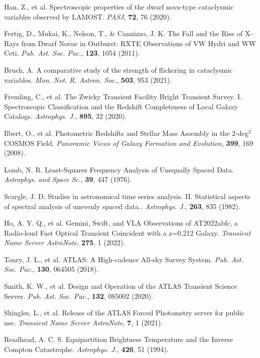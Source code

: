 \documentclass{nature_plusfigure}
\newcommand{\mn}{{Mon. Not. R. Astron. Soc.}}
\newcommand{\mnras}{\mn}
\newcommand{\apj}{{Astrophys. J.}}
\newcommand{\apss}{{Astrophys. and Space Sc.}}
\newcommand{\pasj}{{PASJ}}
\newcommand{\pasp}{{Pub. Ast. Soc. Pac.}}
\begin{document}
\begin{methods}
\begin{thebibliography}{10}
 Han, Z., et al. Spectroscopic properties of the dwarf nova-type cataclysmic variables observed by LAMOST. \emph{\pasj}, \textbf{72}, 76 (2020). 

 Fertig, D., Mukai, K., Nelson, T., \& Cannizzo, J. K. The Fall and the Rise of X-Rays from Dwarf Novae in Outburst: RXTE Observations of VW Hydri and WW Ceti. \emph{\pasp}, \textbf{123}, 1054 (2011). 

 Bruch, A. A comparative study of the strength of flickering in cataclysmic variables. \emph{\mnras}, \textbf{503}, 953 (2021). 

 Fremling, C., et al. The Zwicky Transient Facility Bright Transient Survey. I. Spectroscopic Classification and the Redshift Completeness of Local Galaxy Catalogs. \emph{\apj}, \textbf{895}, 32 (2020).

 Ilbert, O., et al. Photometric Redshifts and Stellar Mass Assembly in the 2-deg$^2$ COSMOS Field. \emph{Panoramic Views of Galaxy Formation and Evolution}, \textbf{399}, 169 (2008). 


 Lomb, N. R. Least-Squares Frequency Analysis of Unequally Spaced Data. \emph{\apss}, \textbf{39}, 447 (1976). 

 Scargle, J. D. Studies in astronomical time series analysis. II. Statistical aspects of spectral analysis of unevenly spaced data.. \emph{\apj}, \textbf{263}, 835 (1982). 


 Ho, A. Y. Q., et al. Gemini, Swift, and VLA Observations of AT2022abfc, a Radio-loud Fast Optical Transient Coincident with a z=0.212 Galaxy. \emph{Transient Name Server AstroNote}, \textbf{275}, 1 (2022). 

  Tonry, J. L., et al. ATLAS: A High-cadence All-sky Survey System. \emph{\pasp}, \textbf{130}, 064505 (2018). 

 Smith, K. W., et al. Design and Operation of the ATLAS Transient Science Server. \emph{\pasp}, \textbf{132}, 085002 (2020). 

 Shingles, L., et al. Release of the ATLAS Forced Photometry server for public use. \emph{Transient Name Server AstroNote}, \textbf{7}, 1 (2021). 

 Readhead, A. C. S. Equipartition Brightness Temperature and the Inverse Compton Catastrophe. \emph{\apj}, \textbf{426}, 51 (1994). 


\end{thebibliography}
\end{methods}
\end{document}
